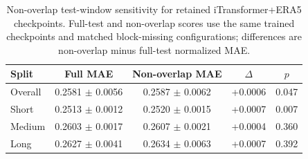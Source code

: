 \begin{table}[t]
  \centering
  \caption{Non-overlap test-window sensitivity for retained iTransformer+ERA5 checkpoints. Full-test and non-overlap scores use the same trained checkpoints and matched block-missing configurations; differences are non-overlap minus full-test normalized MAE.}
  \label{tab:non-overlap-sensitivity}
  \footnotesize
  \setlength{\tabcolsep}{3pt}
  \begin{tabular}{lcccc}
    \toprule
    Split & Full MAE & Non-overlap MAE & $\Delta$ & $p$ \\
    \midrule
    Overall & 0.2581 $\pm$ 0.0056 & 0.2587 $\pm$ 0.0062 & +0.0006 & 0.047 \\
    Short & 0.2513 $\pm$ 0.0012 & 0.2520 $\pm$ 0.0015 & +0.0007 & 0.007 \\
    Medium & 0.2603 $\pm$ 0.0017 & 0.2607 $\pm$ 0.0021 & +0.0004 & 0.360 \\
    Long & 0.2627 $\pm$ 0.0041 & 0.2634 $\pm$ 0.0063 & +0.0007 & 0.392 \\
    \bottomrule
  \end{tabular}
\end{table}
